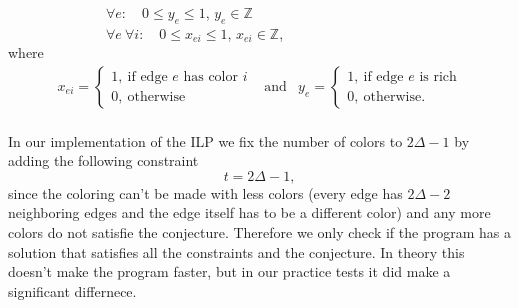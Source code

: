 \documentclass[12pt,a4paper]{amsart}
\theoremstyle{definition} %
\theoremstyle{plain} %
\newcommand{\Z}{\mathbb Z}
\begin{document}
        \ \ \ \ \ \ \ \ \ \ \ \ \ \ $\forall e: \quad 0 \leq y_{e} \leq 1$, $y_{e} \in \Z$\\

        \ \ \ \ \ \ \ \ \ \ \ \ \ \ $\forall e \ \forall i: \quad 0 \leq x_{ei} \leq 1$, $x_{ei} \in \Z$,\\

        where
        \begin{align*}        x_{ei} = \begin{cases}
                    1, \  \text{if edge $e$ has color $i$} \\
                    0, \  \text{otherwise}
            \end{cases} & \text{and} & 
            y_{e} = \begin{cases}
                1, \  \text{if edge $e$ is rich} \\
                0, \  \text{otherwise.}
            \end{cases}
        \end{align*}\\


        In our implementation of the ILP we fix the number of colors to $2 \Delta - 1$ by adding the following constraint
        $$
            t = 2\Delta - 1,
        $$
        since the coloring can't be made with less colors (every edge has $2 \Delta - 2$ neighboring edges and the edge itself has to be a different color) and any more colors do not satisfie the conjecture. Therefore we only check if the program has a solution that satisfies all the constraints and the conjecture. In theory this doesn't make the program faster, but in our practice tests it did make a significant differnece.\\
\end{document}

